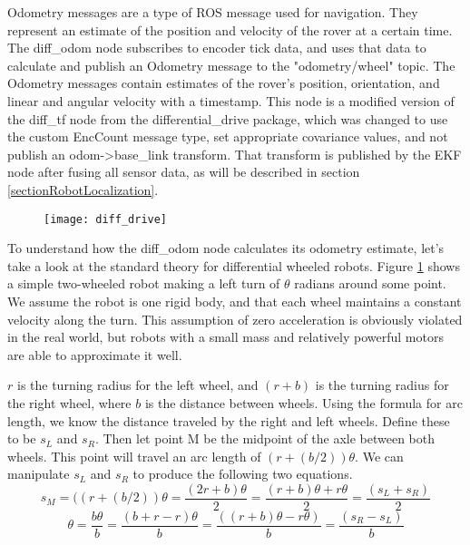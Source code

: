 Odometry messages are a type of ROS message used for navigation. They represent an estimate of the position and velocity of the rover at a certain time. The diff\_odom node subscribes to encoder tick data, and uses that data to calculate and publish an Odometry message to the "odometry/wheel" topic. The Odometry messages contain estimates of the rover's position, orientation, and linear and angular velocity with a timestamp. This node is a modified version of the diff\_tf node from the differential\_drive package, which was changed to use the custom EncCount message type, set appropriate covariance values, and not publish an odom->base\_link transform. That transform is published by the EKF node after fusing all sensor data, as will be described in section \ref{sectionRobotLocalization}.

\begin{figure}[h]
	\caption{\cite{differentialSteeringPaper}}
	\centering
	\texttt{[image: diff\_drive]}
	\label{figDiffDrive}
\end{figure}

To understand how the diff\_odom node calculates its odometry estimate, let's take a look at the standard theory for differential wheeled robots. Figure \ref{figDiffDrive} shows a simple two-wheeled robot making a left turn of \(\theta\) radians around some point. We assume the robot is one rigid body, and that each wheel maintains a constant velocity along the turn. This assumption of zero acceleration is obviously violated in the real world, but robots with a small mass and relatively powerful motors are able to approximate it well. \cite{differentialSteeringPaper}

\(r\) is the turning radius for the left wheel, and \((r+b)\) is the turning radius for the right wheel, where \(b\) is the distance between wheels. Using the formula for arc length, we know the distance traveled by the right and left wheels. Define these to be \(s_L\) and \(s_R\). Then let point M be the midpoint of the axle between both wheels. This point will travel an arc length of \((r+(b/2)) \theta \). We can manipulate \(s_L\) and \(s_R\) to produce the following two equations.
\begin{equation} \label{eqDiffSM}
s_M = ((r+(b/2)) \theta = \frac{(2r + b) \theta}{2} = \frac{(r + b)\theta + r \theta}{2} = \frac{(s_L + s_R)}{2}
\end{equation}
\begin{equation} \label{eqDiffTheta}
\theta = \frac{b\theta}{b} = \frac{(b + r - r) \theta}{b} = \frac{((r+b) \theta - r \theta)}{b} = \frac{(s_R - s_L)}{b}
\end{equation}

